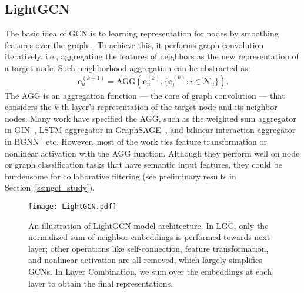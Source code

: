 \documentclass[sigconf]{acmart}
\theoremstyle{definition}
\begin{document}
\subsection{LightGCN}
The basic idea of GCN is to learning representation for nodes by smoothing features over the graph~\cite{GCN,SGCN}. 
To achieve this, it performs graph convolution iteratively, i.e., aggregating the features of neighbors as the new representation of a target node. 
Such neighborhood aggregation can be abstracted as:
\begin{equation}
    \textbf{e}_{u}^{(k+1)} = \text{AGG} ( \textbf{e}_{u}^{(k)},  \{ \textbf{e}_i^{(k)} : i \in \mathcal{N}_u \}).
\end{equation}
The AGG is an aggregation function --- the core of graph convolution --- that considers the $k$-th layer's representation of the target node and its neighbor nodes. Many work have specified the AGG, such as the weighted sum aggregator in GIN~\cite{GIN}, LSTM aggregator in GraphSAGE~\cite{GraphSAGE}, and bilinear interaction aggregator in BGNN~\cite{BGNN} etc. However, most of the work ties feature transformation or nonlinear activation with the AGG function. Although they perform well on node or graph classification tasks that have semantic input features, they could be burdensome for collaborative filtering (see preliminary results in Section~\ref{ss:ngcf_study}).

\begin{figure}[t]
\centering
	\small	
	\texttt{[image: LightGCN.pdf]}\vspace{-5pt}
	\caption{An illustration of LightGCN model architecture. 
In LGC, only the normalized sum of neighbor embeddings is performed towards next layer; other operations like self-connection, feature transformation, and nonlinear activation are all removed, which largely simplifies GCNs. In Layer Combination, we sum over the embeddings at each layer to obtain the final representations.}\vspace{-10pt}
	\label{fig:LightGCN}
\end{figure}
\end{document}
